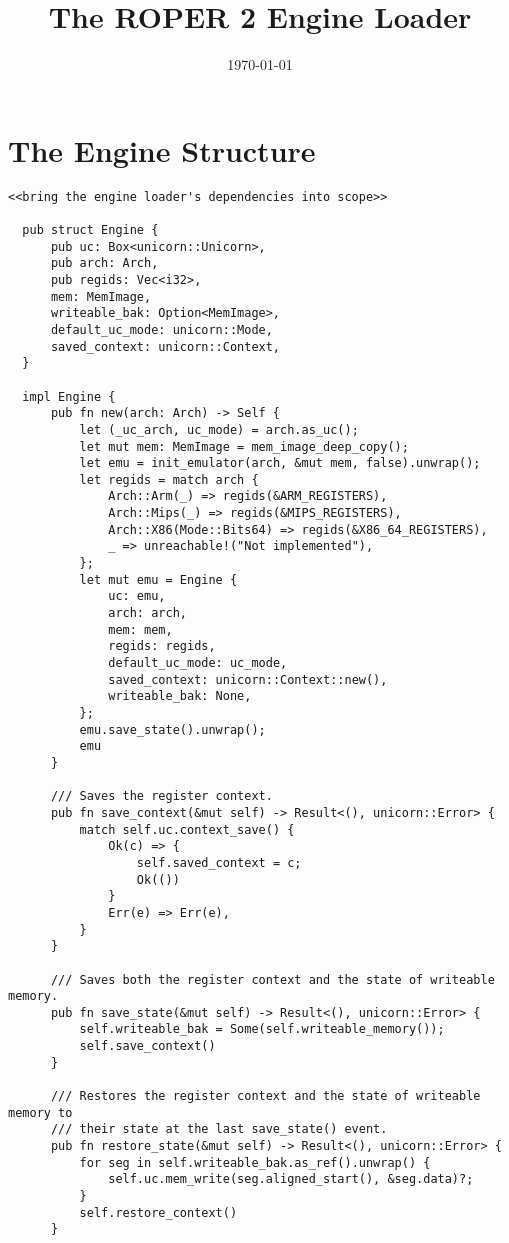 \documentclass[11pt]{article}
\date{\today}
\title{The ROPER 2 Engine Loader}
\begin{document}
\maketitle
\tableofcontents



\section{The Engine Structure}
\label{sec:orgd03f381}

\lstset{language=rust,label=org64a5317,caption= ,captionpos=b,numbers=none}
\begin{lstlisting}
<<bring the engine loader's dependencies into scope>>

  pub struct Engine {
      pub uc: Box<unicorn::Unicorn>,
      pub arch: Arch,
      pub regids: Vec<i32>,
      mem: MemImage,
      writeable_bak: Option<MemImage>,
      default_uc_mode: unicorn::Mode,
      saved_context: unicorn::Context,
  }

  impl Engine {
      pub fn new(arch: Arch) -> Self {
          let (_uc_arch, uc_mode) = arch.as_uc();
          let mut mem: MemImage = mem_image_deep_copy();
          let emu = init_emulator(arch, &mut mem, false).unwrap();
          let regids = match arch {
              Arch::Arm(_) => regids(&ARM_REGISTERS),
              Arch::Mips(_) => regids(&MIPS_REGISTERS),
              Arch::X86(Mode::Bits64) => regids(&X86_64_REGISTERS),
              _ => unreachable!("Not implemented"),
          };
          let mut emu = Engine {
              uc: emu,
              arch: arch,
              mem: mem,
              regids: regids,
              default_uc_mode: uc_mode,
              saved_context: unicorn::Context::new(),
              writeable_bak: None,
          };
          emu.save_state().unwrap();
          emu
      }

      /// Saves the register context.
      pub fn save_context(&mut self) -> Result<(), unicorn::Error> {
          match self.uc.context_save() {
              Ok(c) => {
                  self.saved_context = c;
                  Ok(())
              }
              Err(e) => Err(e),
          }
      }

      /// Saves both the register context and the state of writeable memory.
      pub fn save_state(&mut self) -> Result<(), unicorn::Error> {
          self.writeable_bak = Some(self.writeable_memory());
          self.save_context()
      }

      /// Restores the register context and the state of writeable memory to
      /// their state at the last save_state() event.
      pub fn restore_state(&mut self) -> Result<(), unicorn::Error> {
          for seg in self.writeable_bak.as_ref().unwrap() {
              self.uc.mem_write(seg.aligned_start(), &seg.data)?;
          }
          self.restore_context()
      }


\end{lstlisting}
\end{document}
